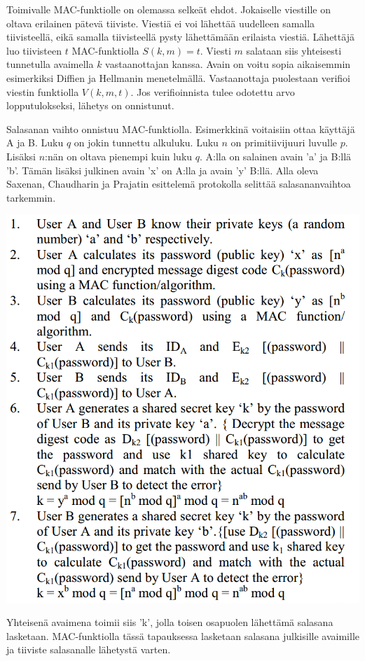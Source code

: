\documentclass[finnish]{tktltiki2}
\theoremstyle{definition}
\theoremstyle{remark}
\begin{document}
Toimivalle MAC-funktiolle on olemassa selkeät ehdot. Jokaiselle viestille on oltava erilainen pätevä tiiviste. Viestiä ei voi lähettää uudelleen samalla tiivisteellä, eikä samalla tiivisteellä pysty lähettämään erilaista viestiä. Lähettäjä luo tiivisteen $t$ MAC-funktiolla $S(k,m) = t$. Viesti $m$ salataan siis yhteisesti tunnetulla avaimella $k$ vastaanottajan kanssa. Avain on voitu sopia aikaisemmin esimerkiksi Diffien ja Hellmanin menetelmällä. Vastaanottaja puolestaan verifioi viestin funktiolla $V(k, m, t)$. Jos verifioinnista tulee odotettu arvo lopputulokseksi, lähetys on onnistunut. \cite{MACA} 
 
Salasanan vaihto onnistuu MAC-funktiolla. Esimerkkinä voitaisiin ottaa käyttäjä A ja B. Luku $q$ on jokin tunnettu alkuluku. Luku $n$ on primitiivijuuri luvulle $p$. Lisäksi $n$:nän on oltava pienempi kuin luku $q$. A:lla on salainen avain 'a' ja B:llä 'b'. Tämän lisäksi julkinen avain 'x' on A:lla ja avain 'y' B:llä. Alla oleva Saxenan, Chaudharin ja Prajatin \cite{MAC} esittelemä protokolla selittää salasananvaihtoa tarkemmin.

\includegraphics[scale=0.5]{MAC-salasana}

Yhteisenä avaimena toimii siis 'k', jolla toisen osapuolen lähettämä salasana lasketaan. MAC-funktiolla tässä tapauksessa lasketaan salasana julkisille avaimille ja tiiviste salasanalle lähetystä varten.
\end{document}
